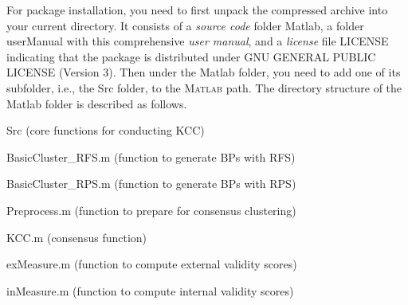 \documentclass[10pt]{acmtrans2e}
\newcommand{\Matlab}{\textsc{Matlab}}
\begin{document}
\noindent For package installation, you need to first unpack the compressed archive into your current directory. It consists of a \emph{source code} folder \textsf{Matlab}, a folder \textsf{userManual} with this comprehensive \emph{user manual}, and a \emph{license} file \textsf{LICENSE} indicating that the package is distributed under GNU GENERAL PUBLIC LICENSE (Version 3). Then under the \textsf{Matlab} folder, you need to add one of its subfolder, i.e., the \textsf{Src} folder, to the \Matlab{} path. The directory structure of the \textsf{Matlab} folder is described as follows.
\begin{compactitem}
  \item \textsf{Src} (core functions for conducting KCC)
  \begin{compactitem}
   \item \textsf{BasicCluster\_RFS.m} (function to generate BPs with RFS)
   \item \textsf{BasicCluster\_RPS.m} (function to generate BPs with RPS)
   \item \textsf{Preprocess.m} (function to prepare for consensus clustering)
   \item \textsf{KCC.m} (consensus function)
   \item \textsf{exMeasure.m} (function to compute external validity scores)
   \item \textsf{inMeasure.m} (function to compute internal validity scores)


\end{compactitem}
\end{compactitem}
\end{document}
